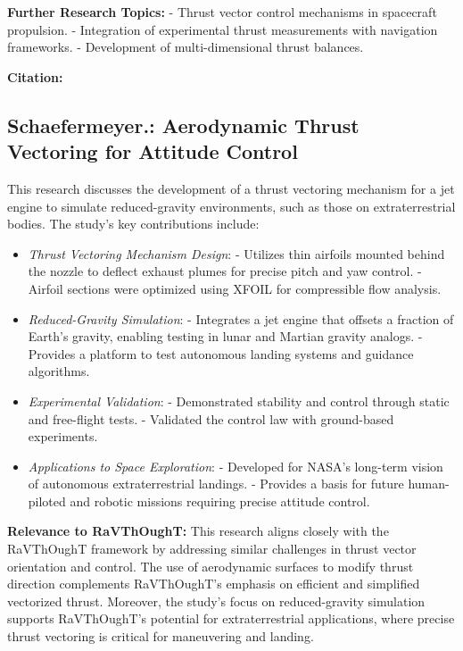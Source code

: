 \textbf{Further Research Topics:}
- Thrust vector control mechanisms in spacecraft propulsion.
- Integration of experimental thrust measurements with navigation frameworks.
- Development of multi-dimensional thrust balances.

\textbf{Citation:} 

\subsection{Schaefermeyer.: Aerodynamic Thrust Vectoring for Attitude Control}

This research discusses the development of a thrust vectoring mechanism for a jet engine to simulate reduced-gravity environments, such as those on extraterrestrial bodies. The study's key contributions include:

\begin{itemize}
  \item \textit{Thrust Vectoring Mechanism Design}:
  - Utilizes thin airfoils mounted behind the nozzle to deflect exhaust plumes for precise pitch and yaw control.
  - Airfoil sections were optimized using XFOIL for compressible flow analysis.

  \item \textit{Reduced-Gravity Simulation}:
  - Integrates a jet engine that offsets a fraction of Earth's gravity, enabling testing in lunar and Martian gravity analogs.
  - Provides a platform to test autonomous landing systems and guidance algorithms.

  \item \textit{Experimental Validation}:
  - Demonstrated stability and control through static and free-flight tests.
  - Validated the control law with ground-based experiments.

  \item \textit{Applications to Space Exploration}:
  - Developed for NASA's long-term vision of autonomous extraterrestrial landings.
  - Provides a basis for future human-piloted and robotic missions requiring precise attitude control.
\end{itemize}

\textbf{Relevance to RaVThOughT:}
This research aligns closely with the RaVThOughT framework by addressing similar challenges in thrust vector orientation and control. The use of aerodynamic surfaces to modify thrust direction complements RaVThOughT's emphasis on efficient and simplified vectorized thrust. Moreover, the study's focus on reduced-gravity simulation supports RaVThOughT's potential for extraterrestrial applications, where precise thrust vectoring is critical for maneuvering and landing.

